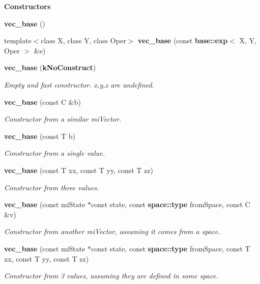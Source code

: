 \begin{Indent}{\bf Constructors}\par
\begin{CompactItemize}
\item 
{\bf vec\_\-base} ()
\item 
template$<$class X, class Y, class Oper$>$ {\bf vec\_\-base} (const {\bf base::exp}$<$ X, Y, Oper $>$ \&e)
\item 
{\bf vec\_\-base} ({\bf k\-No\-Construct})
\begin{CompactList}\small\item\em Empty and fast constructor. x,y,z are undefined. \item\end{CompactList}\item 
{\bf vec\_\-base} (const C \&b)
\begin{CompactList}\small\item\em Constructor from a similar mi\-Vector. \item\end{CompactList}\item 
{\bf vec\_\-base} (const T b)
\begin{CompactList}\small\item\em Constructor from a single value. \item\end{CompactList}\item 
{\bf vec\_\-base} (const T xx, const T yy, const T zz)
\begin{CompactList}\small\item\em Constructor from three values. \item\end{CompactList}\item 
{\bf vec\_\-base} (const mi\-State $\ast$const state, const {\bf space::type} from\-Space, const C \&v)
\begin{CompactList}\small\item\em Constructor from another mi\-Vector, assuming it comes from a space. \item\end{CompactList}\item 
{\bf vec\_\-base} (const mi\-State $\ast$const state, const {\bf space::type} from\-Space, const T xx, const T yy, const T zz)
\begin{CompactList}\small\item\em Constructor from 3 values, assuming they are defined in some space. \item\end{CompactList}\end{CompactItemize}
\end{Indent}
